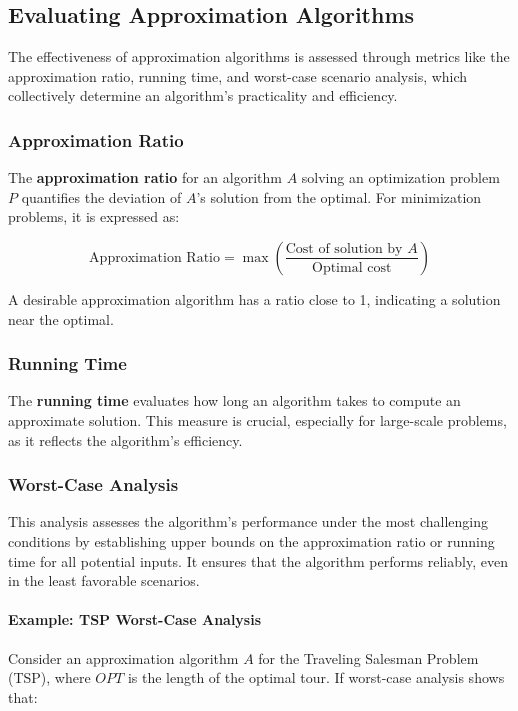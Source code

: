 \documentclass[12pt]{book} %
\begin{document}
\subsection{Evaluating Approximation Algorithms}

The effectiveness of approximation algorithms is assessed through metrics like the approximation ratio, running time, and worst-case scenario analysis, which collectively determine an algorithm's practicality and efficiency.

\subsubsection{Approximation Ratio}

The \textbf{approximation ratio} for an algorithm \(A\) solving an optimization problem \(P\) quantifies the deviation of \(A\)'s solution from the optimal. For minimization problems, it is expressed as:

\[
\text{Approximation Ratio} = \max \left( \frac{\text{Cost of solution by } A}{\text{Optimal cost}} \right)
\]

A desirable approximation algorithm has a ratio close to 1, indicating a solution near the optimal.

\subsubsection{Running Time}

The \textbf{running time} evaluates how long an algorithm takes to compute an approximate solution. This measure is crucial, especially for large-scale problems, as it reflects the algorithm's efficiency.

\subsubsection{Worst-Case Analysis}

This analysis assesses the algorithm's performance under the most challenging conditions by establishing upper bounds on the approximation ratio or running time for all potential inputs. It ensures that the algorithm performs reliably, even in the least favorable scenarios.

\paragraph{Example: TSP Worst-Case Analysis}

Consider an approximation algorithm \(A\) for the Traveling Salesman Problem (TSP), where \(OPT\) is the length of the optimal tour. If worst-case analysis shows that:
\end{document}
